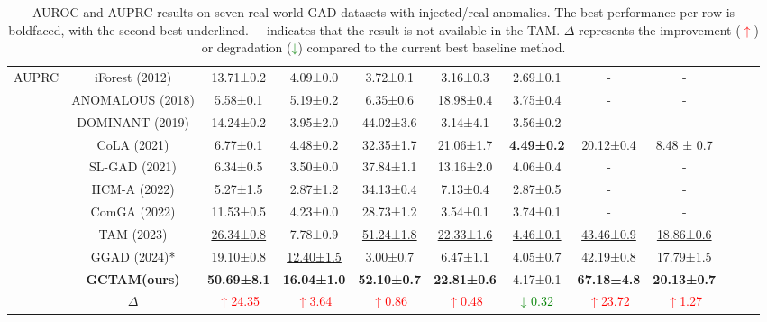 \documentclass{article}
\begin{document}
\begin{table}[ht!]
{\begin{tabular}{c|c|cccccccccc}
\\ \hline

\multirow{9}{*}{AUPRC} 
& iForest (2012)      & 13.71±0.2  & 4.09±0.0   & 3.72±0.1   & 3.16±0.3   & 2.69±0.1   & -          & -          \\
& ANOMALOUS (2018)    & 5.58±0.1   & 5.19±0.2   & 6.35±0.6   & 18.98±0.4  & 3.75±0.4   & -          & -          \\
& DOMINANT (2019)     & 14.24±0.2  & 3.95±2.0   & 44.02±3.6  & 3.14±4.1   & 3.56±0.2   & -          & -          \\
& CoLA (2021)         & 6.77±0.1   & 4.48±0.2   & 32.35±1.7  & 21.06±1.7  & \textbf{4.49±0.2}   & 20.12±0.4          & 8.48 ± 0.7         \\
& SL-GAD (2021)       & 6.34±0.5   & 3.50±0.0   & 37.84±1.1  & 13.16±2.0  & 4.06±0.4   & -          & -          \\
& HCM-A (2022)        & 5.27±1.5   & 2.87±1.2   & 34.13±0.4  & 7.13±0.4   & 2.87±0.5   & -          & -          \\
& ComGA (2022)        & 11.53±0.5  & 4.23±0.0   & 28.73±1.2  & 3.54±0.1   & 3.74±0.1   & -          & -          \\
& TAM (2023)          & \underline{26.34±0.8}  & {7.78±0.9}  & \underline{51.24±1.8}  & \underline{22.33±1.6}  & \underline{4.46±0.1}  & \underline{43.46±0.9}  & \underline{18.86±0.6} \\

& GGAD (2024)*          & {19.10±0.8}  & \underline{12.40±1.5}  & {3.00±0.7}  & {6.47±1.1}  & {4.05±0.7}  & {42.19±0.8}  & {17.79±1.5} \\

& \textbf{GCTAM(ours)} & \textbf{50.69±8.1}  & \textbf{16.04±1.0}  & \textbf{52.10±0.7}  & \textbf{22.81±0.6}  & 4.17±0.1  & \textbf{67.18±4.8}  & \textbf{20.13±0.7} \\ 

& $\Delta$ & \textcolor{red}{$\uparrow$24.35} & \textcolor{red}{$\uparrow$3.64} & \textcolor{red}{$ \uparrow$0.86} & \textcolor{red}{$\uparrow$0.48} & \textcolor{green}{↓  0.32} & \textcolor{red}{$\uparrow$23.72} & \textcolor{red}{$\uparrow$1.27} \\
\bottomrule
\end{tabular}%
}

\caption{AUROC and AUPRC results on seven real-world GAD datasets with injected/real anomalies. The best performance per row is boldfaced, with the second-best underlined. $-$ indicates that the result is not available in the TAM. $\Delta$ represents the improvement (\textcolor{red}{$\uparrow$}) or degradation (\textcolor{green}{↓}) compared to the current best baseline method.}
\label{tab: main_result}
\end{table} 
\end{document}
